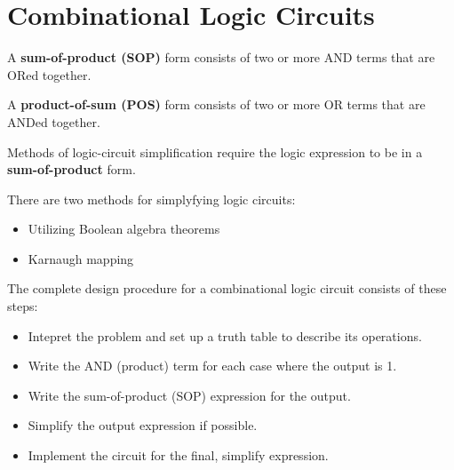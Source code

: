\chapter{Combinational Logic Circuits}

        \par A \textbf{sum-of-product (SOP)} form consists of two or more AND terms
        that are ORed together.
        \par A \textbf{product-of-sum (POS)} form consists of two or more OR terms
        that are ANDed together.
        \par Methods of logic-circuit simplification require the logic expression
        to be in a \textbf{sum-of-product} form.

    \par There are two methods for simplyfying logic circuits:
    \begin{itemize}
        \item Utilizing Boolean algebra theorems
        \item Karnaugh mapping
    \end{itemize}

    \par The complete design procedure for a combinational logic circuit
        consists of these steps:
    \begin{itemize}
        \item Intepret the problem and set up a truth table to describe its
            operations.
        \item Write the AND (product) term for each case where the output is 1.
        \item Write the sum-of-product (SOP) expression for the output.
        \item Simplify the output expression if possible.
        \item Implement the circuit for the final, simplify expression.
    \end{itemize}

